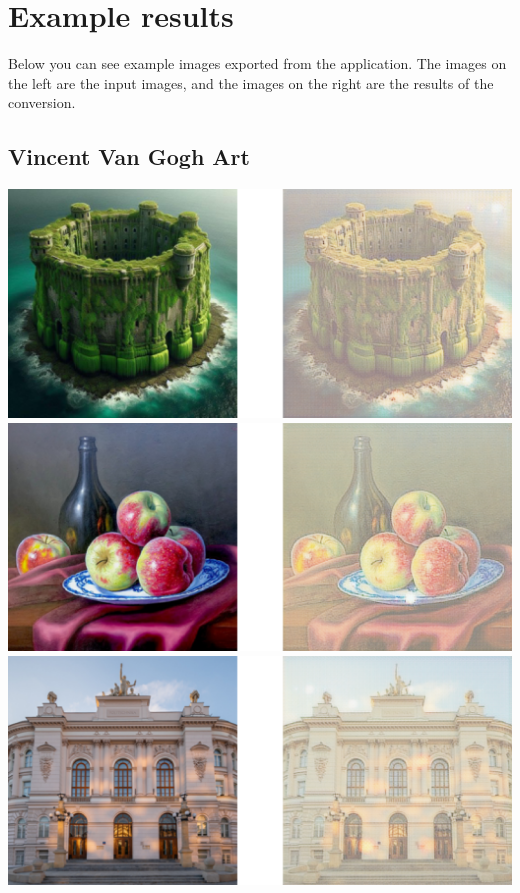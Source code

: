 \documentclass{article}
\begin{document}
\newpage

\section{Example results}
Below you can see example images exported from the application. The images on the left are the input images, and the images on the right are the results of the conversion.

\subsection{Vincent Van Gogh Art}
\includegraphics[width=\textwidth]{../imgs/side_by_side/v1.png}
\vspace{3mm} \\
\includegraphics[width=\textwidth]{../imgs/side_by_side/v2.png}
\vspace{3mm} \\
\includegraphics[width=\textwidth]{../imgs/side_by_side/v3.png}
\end{document}
